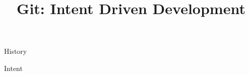 \documentclass{beamer}
\title{Git: Intent Driven Development}
\author{}
\begin{document}
\newcommand{\commit}[3]{
  \node[circle, draw, radius=0.5cm, fill=green](#1) at #2{\Huge \texttt{#3}};
}
\newcommand{\specialcommit}[3]{
  \node[circle, draw, radius=0.5cm, fill=lightblue](#1) at #2{\Huge \texttt{#3}};
}
\newcommand{\fixupcommit}[3]{
  \node[circle, draw, radius=0.5cm, fill=cyan, dashed](#1) at #2{\Huge \texttt{#3}};
}
\newcommand{\selectedcommit}[3]{
  \node[circle, draw, radius=0.5cm, fill=cyan, very thick](#1) at #2{\Huge \texttt{#3}};
}
\newcommand{\anoncommit}[2]{
  \node[circle, draw, minimum size=1cm, fill=green](#1) at #2{};
}
\newcommand{\selectedanoncommit}[2]{
  \node[circle, draw, minimum size=1cm, fill=green, thick](#1) at #2{};
}
\newcommand{\branch}[3]{
  \node[draw, fill=yellow](#1) at #2{\texttt{#3}};
}
\newcommand{\selectedbranch}[3]{
  \node[draw, fill=yellow, thick](#1) at #2{\texttt{#3}};
}
\newcommand{\textbox}[3]{
  \node(#1)[draw, fill=white, rounded corners, align=left] at #2 {#3};
}
\newcommand{\squiggle}{\~{}}

\date{}

\begin{frame}
  \titlepage
\end{frame}

\begin{frame}
  \begin{center}
    {\Huge History}
  \end{center}
\end{frame}

\begin{frame}
  \begin{center}
    {\Huge Intent}
  \end{center}
\end{frame}
\end{document}

